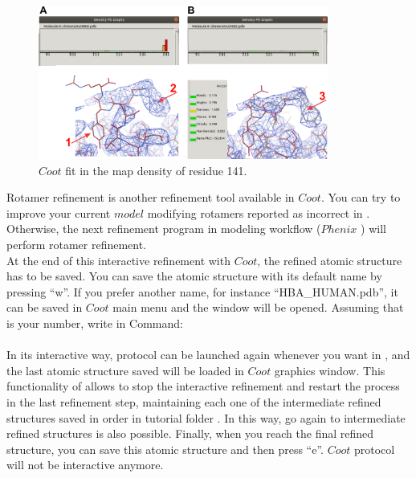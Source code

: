 \begin{itemize}
  \begin{figure}[H]
  \centering 
  \captionsetup{width=.7\linewidth} 
  \includegraphics[width=0.85\textwidth]{Images/Fig28}
  \caption{$Coot$ fit in the map density of residue  141.}
  \label{fig:coot_density_fit_analysis2}
  \end{figure}
  
 Rotamer refinement is another refinement tool available in $Coot$. You can try to improve your current $model$ modifying rotamers reported as incorrect in . Otherwise, the next refinement program in modeling workflow ($Phenix$ ) will perform rotamer refinement.\\
 
 At the end of this interactive refinement with $Coot$, the refined atomic structure has to be saved. You can save the atomic structure with its default name by pressing ``w''. If you prefer another name, for instance ``HBA\_HUMAN.pdb'', it can be saved in $Coot$ main menu  and the  window will be opened. Assuming that  is your  number, write in Command:\\
 \\
  
 In its interactive way,  protocol can be launched again whenever you want in \scipion, and the last atomic structure saved will be loaded in $Coot$ graphics window. This functionality of \scipion allows to stop the interactive refinement and restart the process in the last refinement step, maintaining each one of the intermediate refined structures saved in order in \scipion tutorial folder . In this way, go again to intermediate refined structures is also possible. Finally, when you reach the final refined structure, you can save this atomic structure and then press ``e''. $Coot$ protocol will not be interactive anymore. %
 

\end{itemize}
